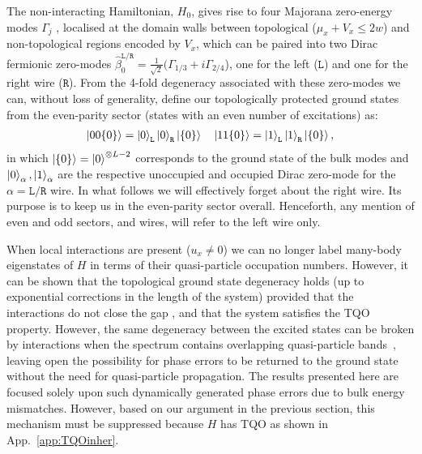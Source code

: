 \documentclass[aps,pra,floatfix,footinbib,longbibliography,twocolumn,superscriptaddress, preprintnumbers, nobibnotes]{revtex4-1}
\begin{document}
The non-interacting Hamiltonian, $H_0$, gives rise to four Majorana zero-energy modes $\Gamma_j$ \cite{Kitaev2001}, localised at the domain walls between topological ($\mu_x+V_x \leq 2w$) and non-topological regions encoded by $V_x$, which can be paired into two Dirac fermionic zero-modes $\hat{\beta}_0^{\mathtt{L}/\mathtt{R}}=\frac{1}{\sqrt{2}}(\Gamma_{1/3}+i\Gamma_{2/4}$), one for the left ($\mathtt{L}$) and one for the right wire ($\mathtt{R}$). From the 4-fold degeneracy associated with these zero-modes we can, without loss of generality, define our topologically protected ground states from the even-parity sector (states with an even number of excitations) as:
\begin{equation}
\label{eq:groundstate}
\begin{split}
\left| 00 \{0 \}\right\rangle = \left|0\right\rangle_{\mathtt{L}}  \left|0\right\rangle_{\mathtt{R}} \left|\{0 \}\right\rangle \quad
\left| 11 \{0 \}\right\rangle= \left|1\right\rangle_{\mathtt{L}} \left|1\right\rangle_{\mathtt{R}}  \left|\{0 \}\right\rangle,
\end{split}
\end{equation}
in which $\left|\{0 \}\right\rangle= \left|0\right\rangle^{\otimes L-2}$ corresponds to the ground state of the bulk modes and $\left|0\right\rangle_\alpha,\left|1\right\rangle_\alpha$ are the respective unoccupied and occupied Dirac zero-mode for the $\alpha=\mathtt{L}/\mathtt{R}$ wire. In what follows we will effectively forget about the right wire. Its purpose is to keep us in the even-parity sector overall. Henceforth, any mention of even and odd sectors, and wires, will refer to the left wire only.

When local interactions are present ($u_x\neq 0$) we can no longer label many-body eigenstates of $H$ in terms of their quasi-particle occupation numbers. However, it can be shown that the topological ground state degeneracy holds (up to exponential corrections in the length of the system) provided that the interactions do not close the gap \cite{Moon2018}, and that the system satisfies the TQO property.
However, the same degeneracy between the excited states can be broken by interactions when the spectrum contains overlapping quasi-particle bands~\cite{Kells2015,Moran2017,Kells2018b,Pellegrino2020}, leaving open the possibility for  phase errors to be returned to the ground state without the need for quasi-particle propagation. The results presented here are focused solely upon such dynamically generated phase errors due to bulk energy mismatches. However, based on our argument in the previous section, this mechanism must be suppressed because $H$ has TQO as shown in App.~\ref{app:TQOinher}.  %
\end{document}
